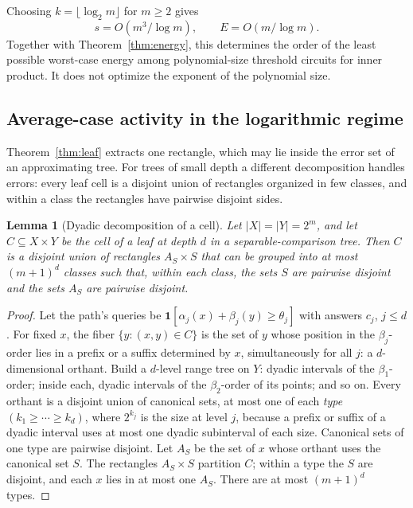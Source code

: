 \documentclass[11pt]{article}
\newtheorem{lemma}[theorem]{Lemma}
\theoremstyle{definition}
\newcommand{\ind}[1]{\mathbf 1[#1]}
\begin{document}
Choosing \(k=\lfloor\log_2m\rfloor\) for \(m\ge2\) gives
\[
 s=O(m^3/\log m),\qquad E=O(m/\log m).
\]
Together with Theorem~\ref{thm:energy}, this determines the order of the least possible worst-case energy among polynomial-size threshold circuits for inner product. It does not optimize the exponent of the polynomial size.

\subsection{Average-case activity in the logarithmic regime}\label{sec:avgcase}
Theorem~\ref{thm:leaf} extracts one rectangle, which may lie inside the error set of an approximating tree. For trees of small depth a different decomposition handles errors: every leaf cell is a disjoint union of rectangles organized in few classes, and within a class the rectangles have pairwise disjoint sides.

\begin{lemma}[Dyadic decomposition of a cell]\label{lem:dyadic_cells}
Let \(|X|=|Y|=2^m\), and let \(C\subseteq X\times Y\) be the cell of a leaf at depth \(d\) in a separable-comparison tree. Then \(C\) is a disjoint union of rectangles \(A_S\times S\) that can be grouped into at most \((m+1)^d\) classes such that, within each class, the sets \(S\) are pairwise disjoint and the sets \(A_S\) are pairwise disjoint.
\end{lemma}
\begin{proof}
Let the path's queries be \(\ind{\alpha_j(x)+\beta_j(y)\ge\theta_j}\) with answers \(c_j\), \(j\le d\). For fixed \(x\), the fiber \(\{y:(x,y)\in C\}\) is the set of \(y\) whose position in the \(\beta_j\)-order lies in a prefix or a suffix determined by \(x\), simultaneously for all \(j\): a \(d\)-dimensional orthant. Build a \(d\)-level range tree on \(Y\): dyadic intervals of the \(\beta_1\)-order; inside each, dyadic intervals of the \(\beta_2\)-order of its points; and so on. Every orthant is a disjoint union of canonical sets, at most one of each \emph{type} \((k_1\ge\cdots\ge k_d)\), where \(2^{k_j}\) is the size at level \(j\), because a prefix or suffix of a dyadic interval uses at most one dyadic subinterval of each size. Canonical sets of one type are pairwise disjoint. Let \(A_S\) be the set of \(x\) whose orthant uses the canonical set \(S\). The rectangles \(A_S\times S\) partition \(C\); within a type the \(S\) are disjoint, and each \(x\) lies in at most one \(A_S\). There are at most \((m+1)^d\) types.
\end{proof}
\end{document}
